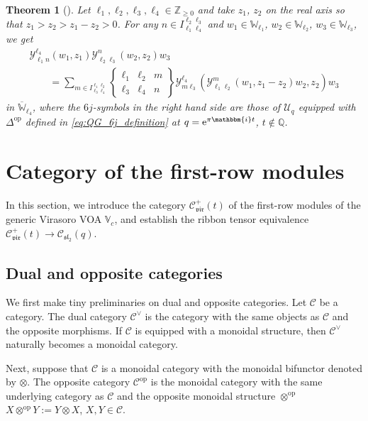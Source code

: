 \documentclass[10pt,a4paper]{amsart}
\numberwithin{equation}{section}
\newtheorem{thm}{Theorem}[section]
\newcommand{\ol}[1]{\overline{#1}}
\newcommand{\op}{\mathrm{op}}
\newcommand{\bQ}{\mathbb{Q}}
\newcommand{\bZ}{\mathbb{Z}}
\newcommand{\cC}{\mathcal{C}}
\newcommand{\cU}{\mathcal{U}}
\newcommand{\fsl}{\mathfrak{sl}}
\newcommand{\bbmi}{\mathbbm{i}}
\newcommand{\UEA}{\cU}
\newcommand{\Uq}{\UEA_{q}}
\newcommand{\QGcoprod}{\Delta}
\newcommand{\sixjsymb}[6]{
\left\{
\begin{array}{ccc}
 #1 & #2 & #5 \\
 #3 & #4 & #6
\end{array}
\right\}
}
\newcommand{\catQG}{\cC_{\fsl_{2}}}
\newcommand{\catVir}{\cC_{\vir}}
\newcommand{\catgen}{\cC}
\newcommand{\Chan}[4]{I^{#1 #2}_{#3 #4}}
\newcommand{\voaint}{\mathcal{Y}}
\newcommand{\vmodvec}{w}
\newcommand{\virvoa}{\mathbb{V}}
\newcommand{\virmod}{\mathbb{W}}
\newcommand{\vir}{\mathfrak{vir}}
\begin{document}
\begin{thm}[\cite{KoshidaKytola2022}]
\label{thm:associativity_int_op_frmods}
Let $\ell_{1},\ell_{2},\ell_{3},\ell_{4}\in\bZ_{\geq 0}$ and take $z_{1}$, $z_{2}$ on the real axis so that $z_{1}>z_{2}>z_{1}-z_{2}>0$.
For any $n\in \Chan{\ell_{2}}{\ell_{3}}{\ell_{1}}{\ell_{4}}$ and $\vmodvec_{1}\in\virmod_{\ell_{1}}$, $\vmodvec_{2}\in\virmod_{\ell_{2}}$, $\vmodvec_{3}\in \virmod_{\ell_{3}}$,
we get
\begin{gather*}
 \voaint_{\ell_{1} n}^{\ell_{4}}(\vmodvec_{1},z_{1})\voaint_{\ell_{2} \ell_{3}}^{n}(\vmodvec_{2},z_{2})\vmodvec_{3} \\
 \qquad = \sum_{m\in \Chan{\ell_{1}}{\ell_{2}}{\ell_{3}}{\ell_{4}}}\sixjsymb{\ell_{1}}{\ell_{2}}{\ell_{3}}{\ell_{4}}{m}{n}\voaint_{m \ell_{3}}^{\ell_{4}}\left(\voaint_{\ell_{1} \ell_{2}}^{m}(\vmodvec_{1},z_{1}-z_{2})\vmodvec_{2},z_{2}\right)\vmodvec_{3}
\end{gather*}
in $\ol{\virmod}_{\ell_{4}}$,
where the $6j$-symbols in the right hand side are those of $\Uq$ equipped with $\QGcoprod^{\op}$ defined in \eqref{eq:QG_6j_definition} at
$q={\rm e}^{\pi \bbmi t}$, $ t\not\in\bQ$.
\end{thm}


\section{Category of the first-row modules}
\label{sect:first-row_module_category}
In this section, we introduce the category $\catVir^{+}(t)$ of the first-row modules of the generic Virasoro VOA $\virvoa_{c}$,
and establish the ribbon tensor equivalence $\catVir^{+}(t)\to \catQG (q)$.

\subsection{Dual and opposite categories}
We first make tiny preliminaries on dual and opposite categories.
Let $\catgen$ be a category.
The dual category $\catgen^{\vee}$ is the category with the same objects as $\catgen$ and the opposite morphisms.
If $\catgen$ is equipped with a monoidal structure, then $\catgen^{\vee}$ naturally becomes a monoidal category.

Next, suppose that $\catgen$ is a monoidal category with the monoidal bifunctor denoted by $\otimes$.
The opposite category $\catgen^{\op}$ is the monoidal category with the same underlying category as $\catgen$ and the opposite monoidal structure $\otimes^{\op}$
$
 X\otimes^{\op}Y:=Y\otimes X$, $ X,Y\in\catgen$.
\end{document}
